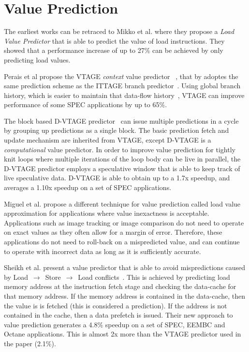 \section{Value Prediction}
The earliest works can be retraced to Mikko et al. where they propose a \textit{Load Value Predictor} \cite{lipasti96valpred} that is able to predict the value of load instructions.
They showed that a performance increase of up to 27\% can be achieved by only predicting load values.

Perais et al propose the VTAGE \textit{context} value predictor ~\cite{peraisVTAGE2014}, that by adoptes the same prediction scheme as the ITTAGE branch predictor~\cite{SeznecITTAGE}.
Using global branch history, which is easier to maintain that data-flow history~\cite{peraisVTAGE2014}, VTAGE can improve performance of some SPEC applications by up to 65\%.

The block based D-VTAGE predictor~\cite{peraisBeBop2015} can issue multiple predictions in a cycle by grouping up predictions as a single block.
The basic prediction fetch and update mechanism are inherited from VTAGE, except D-VTAGE is a \textit{computational} value predictor.
In order to improve value prediction for tightly knit loops where multiple iterations of the loop body can be live in parallel, the D-VTAGE predictor employs a speculative window that is able to keep track of live speculative data.
D-VTAGE is able to obtain up to a 1.7x speedup, and averages a 1.10x speedup on a set of SPEC applications. 

Miguel et al. propose a different technique for value prediction called load value approximation \cite{miguel2014LoadVal} for applications where value inexactness is acceptable.
Applications such as image tracking or image comparison do not need to operate on exact values as they often allow for a margin of error.
Therefore, these applications do not need to roll-back on a mispredicted value, and can continue to operate with incorrect data as long as it is sufficiently accurate.

Sheikh et al. present a value predictor that is able to avoid mispredictions caused by Load $\,\to\,$ Store $\,\to\,$ Load conflicts~\cite{sheikh2017value}.
This is achieved by predicting load memory address at the instruction fetch stage and checking the data-cache for that memory address.
If the memory address is contained in the data-cache, then the value is is fetched (this is considered a prediction).
If the address is not contained in the cache, then a data prefetch is issued.
Their new approach to value prediction generates a 4.8\% speedup on a set of SPEC, EEMBC and Octane applications.
This is almost 2x more than the VTAGE predictor used in the paper (2.1\%).

